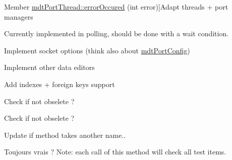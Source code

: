\begin{DoxyRefList}
\hypertarget{todo__todo000035}{}%
Member \hyperlink{classmdt_port_thread_ab31cbe1a85aa830cd368654d1f806326}{mdt\-Port\-Thread\-:\-:error\-Occured} (int error)]Adapt threads + port managers 
\item[\label{todo__todo000036}%
\hypertarget{todo__todo000036}{}%
Member \hyperlink{classmdt_port_thread_helper_aed853f4cedc143c62e7dad5e38ff4b8c}{mdt\-Port\-Thread\-Helper\-:\-:get\-New\-Frame\-Read} ()]Currently implemented in polling, should be done with a wait condition. 
\item[\label{todo__todo000037}%
\hypertarget{todo__todo000037}{}%
Member \hyperlink{classmdt_port_thread_helper_socket_aa77afb8d26e4863bd437e0d59efae7a7}{mdt\-Port\-Thread\-Helper\-Socket\-:\-:mdt\-Port\-Thread\-Helper\-Socket} (Q\-Object $\ast$parent=0)]Implement socket options (think also about \hyperlink{classmdt_port_config}{mdt\-Port\-Config})  
\item[\label{todo__todo000006}%
\hypertarget{todo__todo000006}{}%
Class \hyperlink{classmdt_sql_field_handler_label}{mdt\-Sql\-Field\-Handler\-Label} ]Implement other data editors  
\item[\label{todo__todo000007}%
\hypertarget{todo__todo000007}{}%
Member \hyperlink{classmdt_sql_schema_table_a2cea444ccb26b0802fb230db5460e167}{mdt\-Sql\-Schema\-Table\-:\-:setup\-From\-Table} (const Q\-String \&name, Q\-Sql\-Database db)]Add indexes + foreign keys support  
\item[\label{todo__todo000107}%
\hypertarget{todo__todo000107}{}%
Class \hyperlink{classmdt_sql_table_model}{mdt\-Sql\-Table\-Model} ]Check if not obselete ?  
\item[\label{todo__todo000106}%
\hypertarget{todo__todo000106}{}%
Member \hyperlink{classmdt_sql_table_model_ad423c1b0c74ecbbb575637b028c2574b}{mdt\-Sql\-Table\-Model\-:\-:mdt\-Sql\-Table\-Model} (Q\-Object $\ast$parent=0, Q\-Sql\-Database db=Q\-Sql\-Database())]Check if not obselete ?  
\item[\label{todo__todo000061}%
\hypertarget{todo__todo000061}{}%
Member \hyperlink{classmdt_tt_abstract_tester_a9cc3f5bfe9e27ac0ae376ea1c82e8585}{mdt\-Tt\-Abstract\-Tester\-:\-:set\-Test\-Ui\-Widget} (\hyperlink{class_q_widget}{Q\-Widget} $\ast$widget)]Update if method takes another name.. 
\item[\label{todo__todo000062}%
\hypertarget{todo__todo000062}{}%
Member \hyperlink{classmdt_tt_abstract_tester_af98bb9d80bfbd14873fc356c17d31eb4}{mdt\-Tt\-Abstract\-Tester\-:\-:test\-Is\-Saved} () const ]Toujours vrais ? Note\-: each call of this method will check all test items.  

\end{DoxyRefList}
